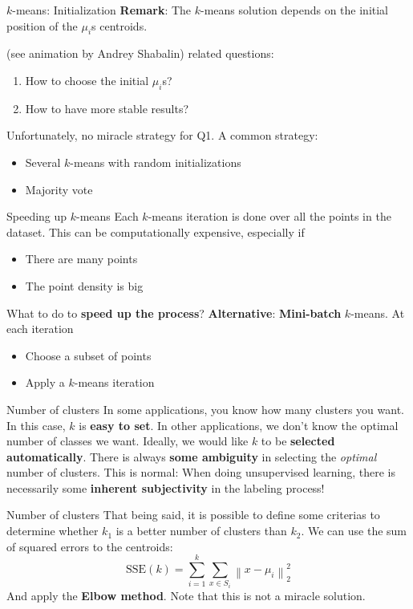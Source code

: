 \documentclass{beamer}
\newcommand{\norm}[1]{\left\lVert#1\right\rVert}
\begin{document}
\begin{frame}{$k$-means: Initialization}
\textbf{Remark}: The $k$-means solution depends on the initial position of the $\mu_i$s centroids.

(see animation by Andrey Shabalin)
\vfill
{} related questions:
\begin{enumerate}
	\item How to choose the initial $\mu_i$s?
	\item How to have more stable results?
\end{enumerate}
\vfill
\pause
Unfortunately, no miracle strategy for Q1. A common strategy:
\begin{itemize}
	\item Several $k$-means with random initializations
	\item Majority vote
\end{itemize}
\end{frame}

\begin{frame}{Speeding up $k$-means}
Each $k$-means iteration is done over all the points in the dataset. This can be computationally expensive, especially if
\begin{itemize}
	\item There are many points
	\item The point density is big
\end{itemize}
What to do to \textbf{speed up the process}?
\pause
\vfill
\textbf{Alternative}: \textbf{Mini-batch} $k$-means. At each iteration
\begin{itemize}
	\item Choose a subset of points
	\item Apply a $k$-means iteration 
\end{itemize}
\end{frame}

\begin{frame}{Number of clusters}
In some applications, you know how many clusters you want. In this case, $k$ is \textbf{easy to set}.
\vfill
In other applications, we don't know the optimal number of classes we want. Ideally, we would like $k$ to be \textbf{selected automatically}.
\vfill
There is always \textbf{some ambiguity} in selecting the \textit{optimal} number of clusters. This is normal: When doing unsupervised learning, there is necessarily some \textbf{inherent subjectivity} in the labeling process!
\end{frame}

\begin{frame}{Number of clusters}
That being said, it is possible to define some criterias to determine whether $k_1$ is a better number of clusters than $k_2$. We can use the sum of squared errors to the centroids:
\begin{equation*}
\text{SSE}(k) = \sum_{i = 1}^{k} \sum_{x \in S_i} \norm{x - \mu_i}_2^2
\end{equation*}
And apply the \textbf{Elbow method}.
\vfill
\pause
Note that this is not a miracle solution.
\end{frame}
\end{document}
